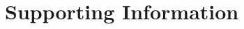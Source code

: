 \documentclass[10pt,letterpaper]{article}
\begin{document}

\newpage

\section*{Supporting Information}
\end{document}
